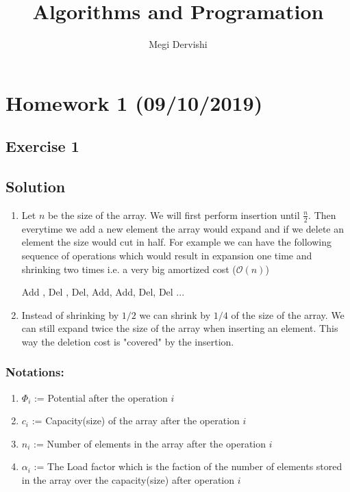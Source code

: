 \documentclass[10pt,a4paper]{article}
\author{Megi Dervishi}
\title{Algorithms and Programation}
\begin{document}
\maketitle
\section*{Homework 1 (09/10/2019)}
\subsection*{Exercise 1}
\subsection*{Solution}
\begin{enumerate}
\item Let $n$ be the size of the array. We will first perform insertion until $\frac{n}{2}$. Then everytime we add a new element the array would expand and if we delete an element the size would cut in half. For example we can have the following sequence of operations which would result in expansion one time and shrinking two times i.e. a very big amortized cost ($\mathcal{O}(n)$)
\begin{center}
Add , Del , Del, Add, Add, Del, Del ...
\end{center}

\item Instead of shrinking by $1/2$ we can shrink by $1/4$ of the size of the array. We can still expand twice the size of the array when inserting an element. This way the deletion cost is "covered" by the insertion.
\end{enumerate}

\subsubsection*{Notations:}

\begin{enumerate}
\item $\Phi _i$ := Potential after the operation $i$ 
\item $c_i$ := Capacity(size) of the array after the operation $i$ 
\item $n_i$ := Number of elements in the array after the operation $i$ 
\item $\alpha_i$ := The Load factor which is the faction of the number of elements stored in the array over the capacity(size) after operation $i$\\
\end{enumerate}
\end{document}
